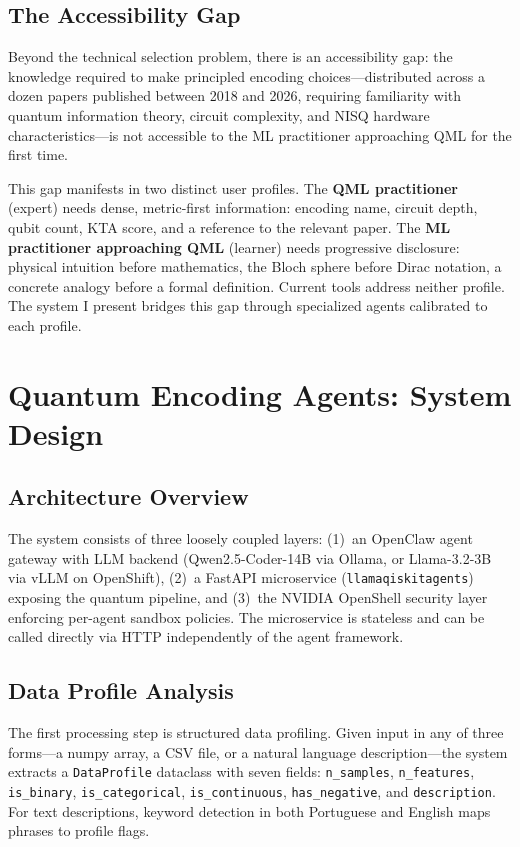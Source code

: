 \documentclass[sigconf,nonacm]{acmart}
\begin{document}
\subsection{The Accessibility Gap}

Beyond the technical selection problem, there is an accessibility gap: the knowledge
required to make principled encoding choices---distributed across a dozen papers
published between 2018 and 2026, requiring familiarity with quantum information
theory, circuit complexity, and NISQ hardware characteristics---is not accessible to
the ML practitioner approaching QML for the first time.

This gap manifests in two distinct user profiles. The \textbf{QML practitioner}
(expert) needs dense, metric-first information: encoding name, circuit depth, qubit
count, KTA score, and a reference to the relevant paper. The \textbf{ML practitioner
approaching QML} (learner) needs progressive disclosure: physical intuition before
mathematics, the Bloch sphere before Dirac notation, a concrete analogy before a
formal definition. Current tools address neither profile. The system I present
bridges this gap through specialized agents calibrated to each profile.

\section{Quantum Encoding Agents: System Design}

\subsection{Architecture Overview}

The system consists of three loosely coupled layers: (1)~an OpenClaw agent gateway
with LLM backend (Qwen2.5-Coder-14B via Ollama, or Llama-3.2-3B via vLLM on
OpenShift), (2)~a FastAPI microservice (\texttt{llama\-qiskit\-agents}) exposing
the quantum pipeline, and (3)~the NVIDIA OpenShell security layer enforcing
per-agent sandbox policies. The microservice is stateless and can be called
directly via HTTP independently of the agent framework.

\subsection{Data Profile Analysis}

The first processing step is structured data profiling. Given input in any of three
forms---a numpy array, a CSV file, or a natural language description---the system
extracts a \texttt{DataProfile} dataclass with seven fields:
\texttt{n\_sam\-ples}, \texttt{n\_fea\-tures}, \texttt{is\_bi\-na\-ry},
\texttt{is\_cat\-e\-gor\-i\-cal}, \texttt{is\_con\-tin\-u\-ous},
\texttt{has\_neg\-a\-tive}, and \texttt{de\-scrip\-tion}.
For text descriptions, keyword detection in both Portuguese
and English maps phrases to profile flags.
\end{document}
